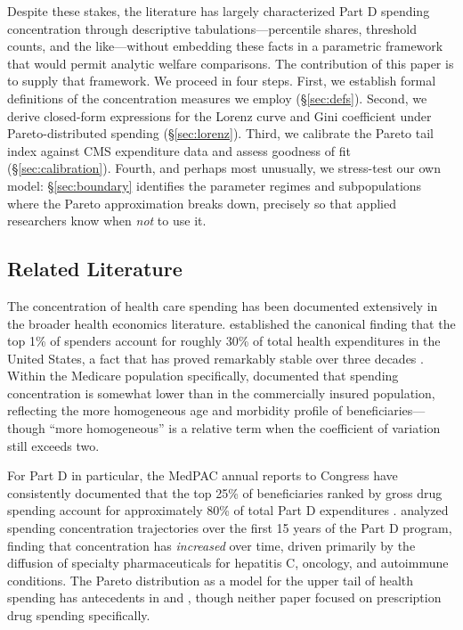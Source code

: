 \documentclass[12pt,letterpaper]{article}
\begin{document}
Despite these stakes, the literature has largely characterized Part D spending
concentration through descriptive tabulations---percentile shares, threshold
counts, and the like---without embedding these facts in a parametric framework
that would permit analytic welfare comparisons. The contribution of this paper
is to supply that framework. We proceed in four steps. First, we establish
formal definitions of the concentration measures we employ (\S\ref{sec:defs}).
Second, we derive closed-form expressions for the Lorenz curve and Gini
coefficient under Pareto-distributed spending (\S\ref{sec:lorenz}). Third,
we calibrate the Pareto tail index against CMS expenditure data and assess
goodness of fit (\S\ref{sec:calibration}). Fourth, and perhaps most
unusually, we stress-test our own model: \S\ref{sec:boundary} identifies the
parameter regimes and subpopulations where the Pareto approximation breaks
down, precisely so that applied researchers know when \emph{not} to use it.

\subsection{Related Literature}

The concentration of health care spending has been documented extensively in
the broader health economics literature. \citet{Berk1988} established the
canonical finding that the top 1\% of spenders account for roughly 30\% of
total health expenditures in the United States, a fact that has proved
remarkably stable over three decades
\citep{Mitchell2019}. Within the Medicare population specifically,
\citet{Riley2007} documented that spending concentration is somewhat lower
than in the commercially insured population, reflecting the more homogeneous
age and morbidity profile of beneficiaries---though ``more homogeneous'' is a
relative term when the coefficient of variation still exceeds two.

For Part D in particular, the MedPAC annual reports to Congress have
consistently documented that the top 25\% of beneficiaries ranked by gross
drug spending account for approximately 80\% of total Part D expenditures
\citep{MedPAC2023}. \citet{Coe2023} analyzed spending concentration
trajectories over the first 15 years of the Part D program, finding that
concentration has \emph{increased} over time, driven primarily by the
diffusion of specialty pharmaceuticals for hepatitis C, oncology, and
autoimmune conditions. The Pareto distribution as a model for the upper tail
of health spending has antecedents in \citet{Manning1987} and
\citet{Jones2011}, though neither paper focused on prescription drug spending
specifically.
\end{document}
